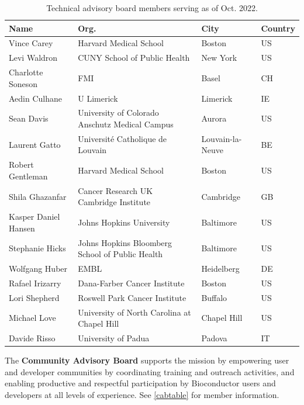 \documentclass[letterpaper]{article}
\begin{document}
\begin{table}[ht]
\label{tabtable}
\caption{Technical advisory board members serving as of Oct. 2022.}
\centering
\begin{tabular}{llll}
  \hline
 Name & Org. & City & Country \\ 
  \hline
 Vince Carey & Harvard Medical School & Boston & US \\ 
 Levi Waldron & CUNY School of Public Health & New York & US \\ 
 Charlotte Soneson & FMI & Basel & CH \\ 
 Aedin Culhane & U Limerick & Limerick & IE \\ 
 Sean Davis & University of Colorado Anschutz Medical Campus & Aurora & US \\ 
 Laurent Gatto & Université Catholique de Louvain & Louvain-la-Neuve & BE \\ 
 Robert Gentleman & Harvard Medical School & Boston & US \\ 
 Shila Ghazanfar & Cancer Research UK Cambridge Institute & Cambridge & GB \\ 
 Kasper Daniel Hansen & Johns Hopkins University & Baltimore & US \\ 
 Stephanie Hicks & Johns Hopkins Bloomberg School of Public Health & Baltimore & US \\ 
 Wolfgang Huber & EMBL & Heidelberg & DE \\ 
 Rafael Irizarry & Dana-Farber Cancer Institute & Boston &  US \\ 
 Lori Shepherd & Roswell Park Cancer Institute & Buffalo & US \\ 
 Michael Love & University of North Carolina at Chapel Hill & Chapel Hill & US \\ 
 Davide Risso & University of Padua & Padova & IT \\ 
   \hline
\end{tabular}
\end{table}


The \textbf{Community Advisory Board} supports the
\Bioconductor{} mission by empowering user and developer communities
by coordinating training and outreach activities, and enabling
productive and respectful participation by Bioconductor users and
developers at all levels of experience.  See \ref{cabtable} for
member information.
\end{document}
